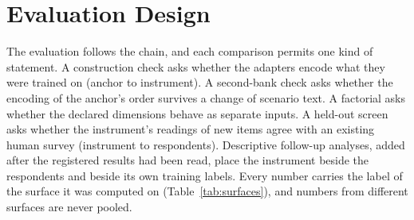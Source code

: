 \section{Evaluation Design}\label{sec:design}

The evaluation follows the chain, and each comparison permits one kind of statement. A construction check asks whether the adapters encode what they were trained on (anchor to instrument). A second-bank check asks whether the encoding of the anchor's order survives a change of scenario text. A factorial asks whether the declared dimensions behave as separate inputs. A held-out screen asks whether the instrument's readings of new items agree with an existing human survey (instrument to respondents). Descriptive follow-up analyses, added after the registered results had been read, place the instrument beside the respondents and beside its own training labels. Every number carries the label of the surface it was computed on (Table~\ref{tab:surfaces}), and numbers from different surfaces are never pooled.

